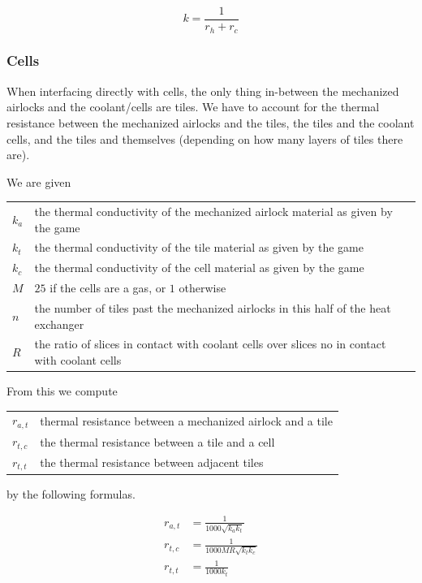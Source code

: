 \documentclass{article}
\numberwithin{equation}{subsection}
\theoremstyle{remark}
\newenvironment{definitiontable}{
\renewcommand{\arraystretch}{1.5}
\begin{tabular}{lp{0.8\textwidth}}
}
{
\end{tabular}
\renewcommand{\arraystretch}{1.0}
}
\begin{document}
\begin{equation}
k = \frac{1}{r_{h} + r_{c}}
\end{equation}

\subsubsection{Cells}

When interfacing directly with cells, the only thing in-between the mechanized airlocks and the coolant/cells are tiles.
We have to account for the thermal resistance between the mechanized airlocks and the tiles, the tiles and the coolant cells, and the tiles and themselves (depending on how many layers of tiles there are).

We are given

\begin{definitiontable}
\(k_{a}\) & the thermal conductivity of the mechanized airlock material as given by the game \\

\(k_{t}\) & the thermal conductivity of the tile material as given by the game \\

\(k_{c}\) & the thermal conductivity of the cell material as given by the game \\

\(M\) & \(25\) if the cells are a gas, or \(1\) otherwise \\

\(n\) & the number of tiles past the mechanized airlocks in this half of the heat exchanger \\

\(R\) & the ratio of slices in contact with coolant cells over slices no in contact with coolant cells
\end{definitiontable}

From this we compute

\begin{definitiontable}
\(r_{a,t}\) & thermal resistance between a mechanized airlock and a tile \\

\(r_{t,c}\) & the thermal resistance between a tile and a cell \\

\(r_{t,t}\) & the thermal resistance between adjacent tiles
\end{definitiontable}

by the following formulas.

\begin{align}
r_{a,t} &= \frac{1}{1000 \sqrt{k_{a} k_{t}}} \\
r_{t,c} &= \frac{1}{1000 M R \sqrt{k_{t} k_{c}}} \\
r_{t,t} &= \frac{1}{1000 k_{t}}
\end{align}
\end{document}

